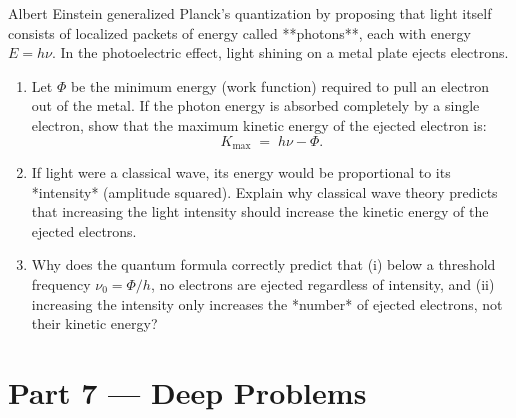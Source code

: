 \documentclass[12pt, a4paper, twoside]{book}
\newcounter{problem}[chapter]
\begin{document}
\begin{problem}
Albert Einstein generalized Planck's quantization by proposing that light itself consists of localized packets of energy called **photons**, each with energy $E = h\nu$.
In the photoelectric effect, light shining on a metal plate ejects electrons.
\begin{enumerate}[label=(\alph*)]
  \item Let $\Phi$ be the minimum energy (work function) required to pull an electron out of the metal. If the photon energy is absorbed completely by a single electron, show that the maximum kinetic energy of the ejected electron is:
  \[
    K_{\text{max}} \;=\; h\nu - \Phi.
  \]
  \item If light were a classical wave, its energy would be proportional to its *intensity* (amplitude squared). Explain why classical wave theory predicts that increasing the light intensity should increase the kinetic energy of the ejected electrons.
  \item Why does the quantum formula correctly predict that (i) below a threshold frequency $\nu_0 = \Phi/h$, no electrons are ejected regardless of intensity, and (ii) increasing the intensity only increases the *number* of ejected electrons, not their kinetic energy?
\end{enumerate}
\end{problem}

\newpage

\section{Part 7 --- Deep Problems}
\end{document}
